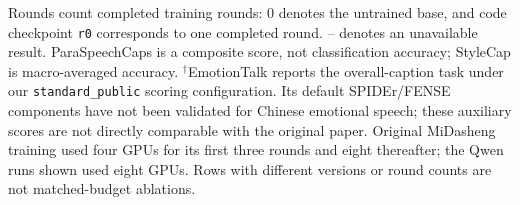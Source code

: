 \begin{table}[t]
\centering
\caption{Preliminary captioning results across backbones and recursive training rounds.}
\label{tab:preliminary-captioner-main}
\small
\setlength{\tabcolsep}{5pt}
\par\smallskip
\begin{minipage}{\linewidth}
\footnotesize
Rounds count completed training rounds: 0 denotes the untrained base, and code checkpoint \texttt{r0} corresponds to one completed round. -- denotes an unavailable result. ParaSpeechCaps is a composite score, not classification accuracy; StyleCap is macro-averaged accuracy. $^{\dagger}$EmotionTalk reports the overall-caption task under our \texttt{standard\_public} scoring configuration. Its default SPIDEr/FENSE components have not been validated for Chinese emotional speech; these auxiliary scores are not directly comparable with the original paper. Original MiDasheng training used four GPUs for its first three rounds and eight thereafter; the Qwen runs shown used eight GPUs. Rows with different versions or round counts are not matched-budget ablations.
\end{minipage}
\end{table}
